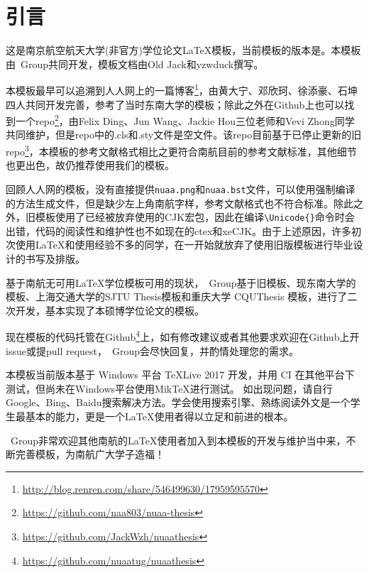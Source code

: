 \chapter{引言}\label{chap:intro}

这是南京航空航天大学(非官方)学位论文\LaTeX 模板，当前模板的版本是\version。本模板由\nuaathesis~Group共同开发，模板文档由Old Jack和yzwduck撰写。

本模板最早可以追溯到人人网上的一篇博客\footnote{\url{http://blog.renren.com/share/546499630/17959595570}}，由黄大宁、邓欣珂、徐添豪、石坤四人共同开发完善，参考了当时东南大学的\seuthesix 模板；除此之外在Github上也可以找到一个repo\footnote{\url{https://github.com/naa803/nuaa-thesis}}，由Felix Ding、Jun Wang、Jackie Hou三位老师和Vevi Zhong同学共同维护，但是repo中的.cls和.sty文件是空文件。该repo目前基于已停止更新的旧repo\footnote{\url{https://github.com/JackWzh/nuaathesis}}，本模板的参考文献格式相比之更符合南航目前的参考文献标准，其他细节也更出色，故仍推荐使用我们的模板。

回顾人人网的模板，没有直接提供\verb|nuaa.png|和\verb|nuaa.bst|文件，可以使用强制编译的方法生成文件，但是缺少左上角南航字样，参考文献格式也不符合标准。除此之外，旧模板使用了已经被放弃使用的CJK宏包，因此在编译\verb+\Unicode{}+命令时会出错，代码的阅读性和维护性也不如现在的ctex和xeCJK。由于上述原因，许多初次使用\LaTeX 和使用经验不多的同学，在一开始就放弃了使用旧版模板进行毕业设计的书写及排版。

基于南航无可用\LaTeX 学位模板可用的现状，\nuaathesis~Group基于旧\oldnuaathesis 模板、现东南大学的\seuthesix 模板、上海交通大学的SJTU Thesis模板和重庆大学 CQUThesis 模板，进行了二次开发，基本实现了本硕博学位论文的模板。

现在\nuaathesis 模板的代码托管在Github\footnote{\url{https://github.com/nuaatug/nuaathesis}}上，如有修改建议或者其他要求欢迎在Github上开issue或提pull request，\nuaathesis~Group会尽快回复，并酌情处理您的需求。

本模板当前版本基于 Windows 平台 \TeX Live 2017 开发，并用 CI 在其他平台下测试，但尚未在Windows平台使用Mik\TeX 进行测试。
如出现问题，请自行Google、Bing、Baidu搜索解决方法。学会使用搜索引擎、熟练阅读外文是一个学生最基本的能力，更是一个\LaTeX 使用者得以立足和前进的根本。

\nuaathesis~Group非常欢迎其他南航的\LaTeX 使用者加入到本模板的开发与维护当中来，不断完善模板，为南航广大学子造福！

